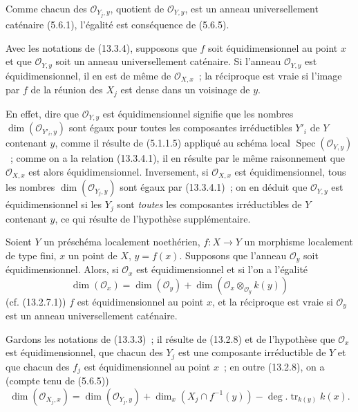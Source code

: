 Comme chacun des $\mathcal O_{Y_j,y}$, quotient de $\mathcal O_{Y,y}$, est un
anneau universellement caténaire (5.6.1), l'égalité est conséquence de (5.6.5).

\begin{corollary}[13.3.5]
\label{IV.13.3.5-fr}
Avec les notations de (13.3.4), supposons que $f$ soit équidimensionnel au
point $x$ et que $\mathcal O_{Y,y}$ soit un anneau universellement caténaire.
Si l'anneau $\mathcal O_{Y,y}$ est équidimensionnel, il en est de même de
$\mathcal O_{X,x}$~; la réciproque est vraie si l'image par $f$ de la réunion
des $X_j$ est dense dans un voisinage de $y$.
\end{corollary}

En effet, dire que $\mathcal O_{Y,y}$ est équidimensionnel signifie que les
nombres $\dim(\mathcal O_{Y'_i,y})$ sont égaux pour toutes les composantes
irréductibles $Y'_i$ de $Y$ contenant $y$, comme il résulte de (5.1.1.5)
appliqué au schéma local $\operatorname{Spec}(\mathcal O_{Y,y})$~; comme on a
la relation (13.3.4.1), il en résulte par le même raisonnement que
$\mathcal O_{X,x}$ est alors équidimensionnel. Inversement, si
$\mathcal O_{X,x}$ est équidimensionnel, tous les nombres
$\dim(\mathcal O_{Y_j,y})$ sont égaux par (13.3.4.1)~; on en déduit que
$\mathcal O_{Y,y}$ est équidimensionnel si les $Y_j$ sont \emph{toutes} les
composantes irréductibles de $Y$ contenant $y$, ce qui résulte de l'hypothèse
supplémentaire.

\begin{proposition}[13.3.6]
\label{IV.13.3.6-fr}
Soient $Y$ un préschéma localement noethérien, $f:X\to Y$ un morphisme
localement de type fini, $x$ un point de $X$, $y=f(x)$. Supposons que l'anneau
$\mathcal O_y$ soit équidimensionnel. Alors, si $\mathcal O_x$ est
équidimensionnel et si l'on a l'égalité
\[
\tag{13.3.6.1}
\label{IV.13.3.6.1-fr}
  \dim(\mathcal O_x)=\dim(\mathcal O_y)
  +\dim(\mathcal O_x\otimes_{\mathcal O_y}k(y))
\]
(cf. (13.2.7.1)) $f$ est équidimensionnel au point $x$, et la réciproque est
vraie si $\mathcal O_y$ est un anneau universellement caténaire.
\end{proposition}

Gardons les notations de (13.3.3)~; il résulte de (13.2.8) et de l'hypothèse
que $\mathcal O_x$ est équidimensionnel, que chacun des $Y_j$ est une
composante irréductible de $Y$ et que chacun des $f_j$ est équidimensionnel au
point $x$~; en outre (13.2.8), on a (compte tenu de (5.6.5))
\[
  \dim(\mathcal O_{X_j,x})=\dim(\mathcal O_{Y_j,y})
  +\dim_x(X_j\cap f^{-1}(y))-\deg.\operatorname{tr}_{k(y)}k(x).
\]

